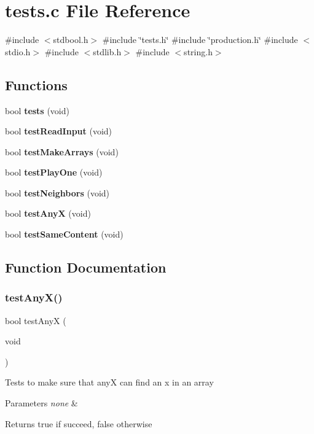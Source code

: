 \section{tests.\+c File Reference}
\label{tests_8c}
{\ttfamily \#include $<$stdbool.\+h$>$}\newline
{\ttfamily \#include \char`\"{}tests.\+h\char`\"{}}\newline
{\ttfamily \#include \char`\"{}production.\+h\char`\"{}}\newline
{\ttfamily \#include $<$stdio.\+h$>$}\newline
{\ttfamily \#include $<$stdlib.\+h$>$}\newline
{\ttfamily \#include $<$string.\+h$>$}\newline
\subsection*{Functions}
\begin{DoxyCompactItemize}
\item 
bool \textbf{ tests} (void)
\item 
bool \textbf{ test\+Read\+Input} (void)
\item 
bool \textbf{ test\+Make\+Arrays} (void)
\item 
bool \textbf{ test\+Play\+One} (void)
\item 
bool \textbf{ test\+Neighbors} (void)
\item 
bool \textbf{ test\+AnyX} (void)
\item 
bool \textbf{ test\+Same\+Content} (void)
\end{DoxyCompactItemize}


\subsection{Function Documentation}
\mbox{\label{tests_8c_a9136792bde961164c06bcdde7ab1d5f5}} 
\subsubsection{test\+Any\+X()}
{\footnotesize\ttfamily bool test\+AnyX (\begin{DoxyParamCaption}\item[{void}]{ }\end{DoxyParamCaption})}

Tests to make sure that anyX can find an x in an array 
\begin{DoxyParams}{Parameters}
{\em none} & \\
\hline
\end{DoxyParams}
\begin{DoxyReturn}{Returns}
true if succeed, false otherwise 
\end{DoxyReturn}


